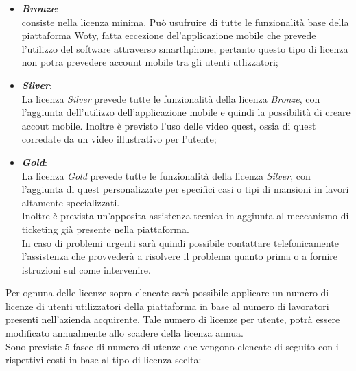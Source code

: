 \begin{itemize}
\item \textbf{\textit{Bronze}}:\\
consiste nella licenza minima.
Può usufruire di tutte le funzionalità base della piattaforma Woty, fatta eccezione del'applicazione mobile che prevede l'utilizzo del software attraverso smarthphone, pertanto questo tipo di licenza non potra prevedere account mobile tra gli utenti utlizzatori;


\item \textbf{\textit{Silver}}:\\
La licenza \textit{Silver} prevede tutte le funzionalità della licenza \textit{Bronze}, con l'aggiunta dell'utilizzo dell'applicazione mobile e quindi la possibilità di creare accout mobile.
Inoltre è previsto l'uso delle video quest, ossia di quest corredate da un video illustrativo per l'utente;


\item \textbf{\textit{Gold}}:\\
La licenza \textit{Gold} prevede tutte le funzionalità della licenza \textit{Silver}, con l'aggiunta di quest personalizzate per specifici casi o tipi di mansioni in lavori altamente specializzati.\\
Inoltre è prevista un'apposita assistenza tecnica in aggiunta al meccanismo di ticketing già presente nella piattaforma.\\
In caso di problemi urgenti sarà quindi possibile contattare telefonicamente l'assistenza che provvederà a risolvere il problema quanto prima o a fornire istruzioni sul come intervenire.\\

\end{itemize}


Per ognuna delle licenze sopra elencate sarà possibile applicare un numero di licenze di utenti utilizzatori della piattaforma in base al numero di lavoratori presenti nell'azienda acquirente. Tale numero di licenze per utente, potrà essere modificato annualmente allo scadere della licenza annua.\\
Sono previste 5 fasce di numero di utenze che vengono elencate di seguito con i rispettivi costi in base al tipo di licenza scelta:


